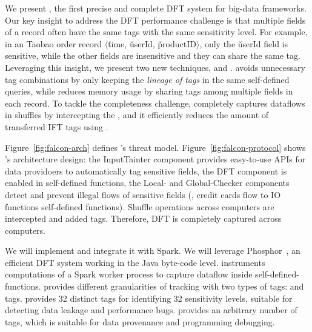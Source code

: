 We present \kakute, the first precise and complete DFT system for big-data 
frameworks. Our key insight to address the DFT performance challenge is that 
multiple fields of a record often have the same tags with the same sensitivity 
level. For example, in an Taobao order record $\langle$\v{time}, 
\v{userId}, \v{productID}$\rangle$, only the \v{userId} field is 
sensitive, while the other fields are insensitive and they can share the same 
tag. Leveraging this insight, we present two new techniques, \lazyp and 
\tagcache. \lazyp avoids unnecessary tag combinations by only keeping the 
\textit{lineage of tags} in the same self-defined queries, while \tagcache 
reduces memory usage by sharing tags among multiple fields in each record. To 
tackle the completeness challenge, \kakute completely captures dataflows in 
shuffles by intercepting the , and it efficiently reduces the amount of 
transferred IFT tags using \tagcache.

Figure~\ref{fig:falcon-arch} defines \kakute's threat 
model. Figure~\ref{fig:falcon-protocol} shows \kakute's architecture 
design: the InputTainter component provides easy-to-use APIs for 
data providoers to automatically tag sensitive fields, the DFT component is 
enabled in self-defined functions, the Local- and Global-Checker components 
detect and prevent illegal flows of sensitive fields (\eg, credit cards flow to 
IO functions self-defined functions). Shuffle operations across computers are 
intercepted and added tags. Therefore, DFT is completely captured across 
computers.

We will implement \kakute and integrate it with Spark. We will leverage 
Phosphor~\cite{oo14:phosphor}, an efficient DFT system working in the Java 
byte-code level. \kakute instruments computations of a Spark worker process
to capture dataflow inside self-defined-functions. \kakute provides different 
granularities of tracking with two types of tags: 
and  tags.  provides 32 distinct tags for 
identifying 32 sensitivity levels, suitable for detecting data leakage and 
performance bugs.  provides an arbitrary number of tags, which is 
suitable for data provenance and programming debugging.

